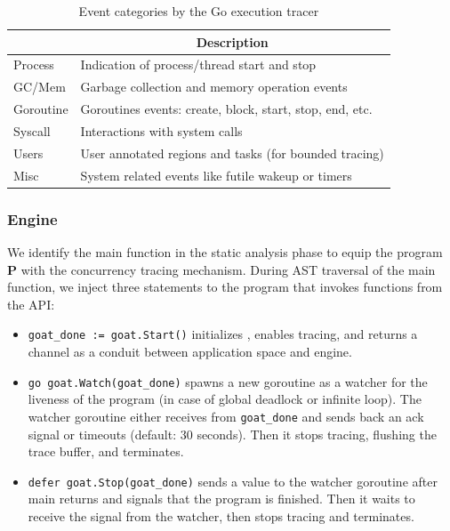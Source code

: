 \begin{table}[]
    \centering
        \caption{Event categories by the Go execution tracer}
        \begin{tabular}{|l|l|}
        \hline
        \rowcolor[HTML]{C0C0C0}
        \multicolumn{1}{|c|}{\cellcolor[HTML]{C0C0C0}\textbf{Category}} & \multicolumn{1}{c|}{\cellcolor[HTML]{C0C0C0}\textbf{Description}} \\ \hline
        Process & Indication of process/thread start and stop \\ \hline
        GC/Mem & Garbage collection and memory operation events\\ \hline
        Goroutine & Goroutines events: create, block, start, stop, end, etc. \\ \hline
        Syscall & Interactions with system calls \\ \hline
        Users & User annotated regions and tasks (for bounded tracing) \\ \hline
        Misc & System related events like futile wakeup or timers \\ \hline
        \end{tabular}
    \label{tab:events}
\end{table}

\subsubsection{\goat Engine}
We identify the main function in the static analysis phase to equip the program \textbf{P} with the concurrency tracing mechanism.
%
During AST traversal of the main function, we inject three statements to the program that invokes functions from the \goat API:
\begin{itemize}
  \item \texttt{goat\_done := goat.Start()} initializes \goat, enables tracing, and returns a channel as a conduit between application space and \goat engine.
  \item \texttt{go goat.Watch(goat\_done)} spawns a new goroutine as a watcher for the liveness of the program (in case of global deadlock or infinite loop). The watcher goroutine either receives from \texttt{goat\_done} and sends back an ack signal or timeouts (default: 30 seconds). Then it stops tracing, flushing the trace buffer, and terminates.
  \item \texttt{defer goat.Stop(goat\_done)} sends a value to the watcher goroutine after main returns and signals that the program is finished. Then it waits to receive the signal from the watcher, then stops tracing and terminates.
\end{itemize}

